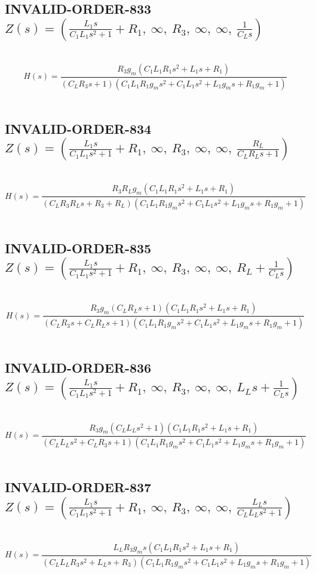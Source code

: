 \documentclass{article}
\begin{document}
\subsection{INVALID-ORDER-833 $Z(s) = \left( \frac{L_{1} s}{C_{1} L_{1} s^{2} + 1} + R_{1}, \  \infty, \  R_{3}, \  \infty, \  \infty, \  \frac{1}{C_{L} s}\right)$ } \ 
\textbf{\[H(s) = \frac{R_{3} g_{m} \left(C_{1} L_{1} R_{1} s^{2} + L_{1} s + R_{1}\right)}{\left(C_{L} R_{3} s + 1\right) \left(C_{1} L_{1} R_{1} g_{m} s^{2} + C_{1} L_{1} s^{2} + L_{1} g_{m} s + R_{1} g_{m} + 1\right)}\] } \ 
\subsection{INVALID-ORDER-834 $Z(s) = \left( \frac{L_{1} s}{C_{1} L_{1} s^{2} + 1} + R_{1}, \  \infty, \  R_{3}, \  \infty, \  \infty, \  \frac{R_{L}}{C_{L} R_{L} s + 1}\right)$ } \ 
\textbf{\[H(s) = \frac{R_{3} R_{L} g_{m} \left(C_{1} L_{1} R_{1} s^{2} + L_{1} s + R_{1}\right)}{\left(C_{L} R_{3} R_{L} s + R_{3} + R_{L}\right) \left(C_{1} L_{1} R_{1} g_{m} s^{2} + C_{1} L_{1} s^{2} + L_{1} g_{m} s + R_{1} g_{m} + 1\right)}\] } \ 
\subsection{INVALID-ORDER-835 $Z(s) = \left( \frac{L_{1} s}{C_{1} L_{1} s^{2} + 1} + R_{1}, \  \infty, \  R_{3}, \  \infty, \  \infty, \  R_{L} + \frac{1}{C_{L} s}\right)$ } \ 
\textbf{\[H(s) = \frac{R_{3} g_{m} \left(C_{L} R_{L} s + 1\right) \left(C_{1} L_{1} R_{1} s^{2} + L_{1} s + R_{1}\right)}{\left(C_{L} R_{3} s + C_{L} R_{L} s + 1\right) \left(C_{1} L_{1} R_{1} g_{m} s^{2} + C_{1} L_{1} s^{2} + L_{1} g_{m} s + R_{1} g_{m} + 1\right)}\] } \ 
\subsection{INVALID-ORDER-836 $Z(s) = \left( \frac{L_{1} s}{C_{1} L_{1} s^{2} + 1} + R_{1}, \  \infty, \  R_{3}, \  \infty, \  \infty, \  L_{L} s + \frac{1}{C_{L} s}\right)$ } \ 
\textbf{\[H(s) = \frac{R_{3} g_{m} \left(C_{L} L_{L} s^{2} + 1\right) \left(C_{1} L_{1} R_{1} s^{2} + L_{1} s + R_{1}\right)}{\left(C_{L} L_{L} s^{2} + C_{L} R_{3} s + 1\right) \left(C_{1} L_{1} R_{1} g_{m} s^{2} + C_{1} L_{1} s^{2} + L_{1} g_{m} s + R_{1} g_{m} + 1\right)}\] } \ 
\subsection{INVALID-ORDER-837 $Z(s) = \left( \frac{L_{1} s}{C_{1} L_{1} s^{2} + 1} + R_{1}, \  \infty, \  R_{3}, \  \infty, \  \infty, \  \frac{L_{L} s}{C_{L} L_{L} s^{2} + 1}\right)$ } \ 
\textbf{\[H(s) = \frac{L_{L} R_{3} g_{m} s \left(C_{1} L_{1} R_{1} s^{2} + L_{1} s + R_{1}\right)}{\left(C_{L} L_{L} R_{3} s^{2} + L_{L} s + R_{3}\right) \left(C_{1} L_{1} R_{1} g_{m} s^{2} + C_{1} L_{1} s^{2} + L_{1} g_{m} s + R_{1} g_{m} + 1\right)}\] } \ 
\end{document}
